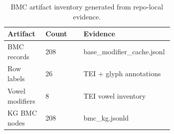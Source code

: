 \begin{table}[t]
\caption{BMC artifact inventory generated from repo-local evidence.}
\label{tab:bmc-inventory}
\small
\begin{tabular}{|p{0.22\linewidth}|p{0.22\linewidth}|p{0.22\linewidth}|}
\hline
Artifact & Count & Evidence \\
\hline
BMC records & 208 & base\_modifier\_cache.jsonl \\
Row labels & 26 & TEI + glyph annotations \\
Vowel modifiers & 8 & TEI vowel inventory \\
KG BMC nodes & 208 & bmc\_kg.jsonld \\
\hline
\end{tabular}
\end{table}

